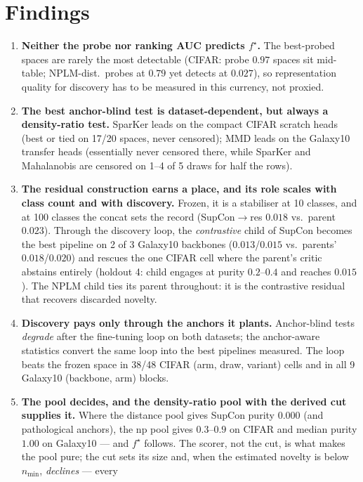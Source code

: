 \documentclass[10pt]{article}
\begin{document}
\section*{Findings}
\begin{enumerate}
\item \textbf{Neither the probe nor ranking AUC predicts $f^\star$.}  The
  best-probed spaces are rarely the most detectable (CIFAR: probe $0.97$
  spaces sit mid-table; NPLM-dist.\ probes at $0.79$ yet detects at
  $0.027$), so representation quality for discovery has to be measured in
  this currency, not proxied.
\item \textbf{The best anchor-blind test is dataset-dependent, but always a
  density-ratio test.}  SparKer leads on the compact CIFAR scratch heads
  (best or tied on 17/20 spaces, never censored); MMD leads on the Galaxy10
  transfer heads (essentially never censored there, while SparKer and
  Mahalanobis are censored on 1--4 of 5 draws for half the rows).
\item \textbf{The residual construction earns a place, and its role scales
  with class count and with discovery.}  Frozen, it is a stabiliser at 10
  classes, and at 100 classes the concat sets the record
  (SupCon$\to$res $0.018$ vs.\ parent $0.023$).  Through the discovery
  loop, the \emph{contrastive} child of SupCon becomes the best pipeline on
  2 of 3 Galaxy10 backbones ($0.013$/$0.015$ vs.\ parents'
  $0.018$/$0.020$) and rescues the one CIFAR cell where the parent's
  critic abstains entirely (holdout 4: child engages at purity
  $0.2$--$0.4$ and reaches $0.015$).  The NPLM child ties its parent
  throughout: it is the contrastive residual that recovers discarded
  novelty.
\item \textbf{Discovery pays only through the anchors it plants.}
  Anchor-blind tests \emph{degrade} after the fine-tuning loop on both
  datasets; the anchor-aware statistics convert the same loop into the best
  pipelines measured.  The loop beats the frozen space in 38/48 CIFAR
  (arm, draw, variant) cells and in all 9 Galaxy10 (backbone, arm) blocks.
\item \textbf{The pool decides, and the density-ratio pool with the derived
  cut supplies it.}  Where the distance pool gives SupCon purity $0.000$
  (and pathological anchors), the np pool gives $0.3$--$0.9$ on CIFAR and
  median purity $1.00$ on Galaxy10 --- and $f^\star$ follows.  The scorer,
  not the cut, is what makes the pool pure; the cut sets its size and, when
  the estimated novelty is below $n_{\min}$, \emph{declines} --- every

\end{enumerate}
\end{document}
